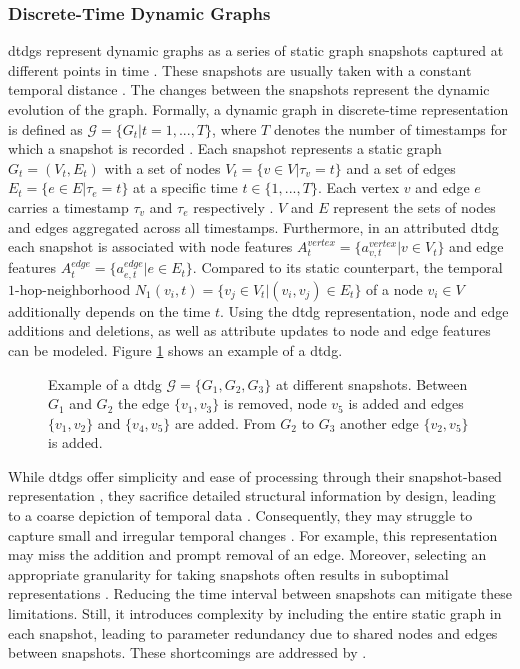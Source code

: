 \subsubsection{Discrete-Time Dynamic Graphs}
\label{s_Background_Graphs_DTDGs}
\glspl{dtdg} represent dynamic graphs as a series of static graph snapshots captured at different points in time \cite{rossi_temporal_2020}. These snapshots are usually taken with a constant temporal distance \cite{souza_provably_2022}. The changes between the snapshots represent the dynamic evolution of the graph. Formally, a dynamic graph in discrete-time representation is defined as $\mathcal{G} = \{G_t | t = 1,...,T\}$, where $T$ denotes the number of timestamps for which a snapshot is recorded \cite{you_roland_2022}. Each snapshot represents a static graph $G_t = (V_t, E_t)$ with a set of nodes $V_t = \{v \in V | \tau_v = t\}$ and a set of edges $E_t = \{e \in E | \tau_e = t\}$ at a specific time $t \in \{1, ..., T\}$. Each vertex $v$ and edge $e$ carries a timestamp $\tau_v$ and $\tau_e$ respectively \cite{you_roland_2022}. $V$ and $E$ represent the sets of nodes and edges aggregated across all timestamps. Furthermore, in an attributed \gls{dtdg} each snapshot is associated with node features $A_t^{vertex} = \{a_{v,t}^{vertex} | v \in V_t\}$ and edge features $A_t^{edge} = \{a_{e,t}^{edge} | e \in E_t\}$. Compared to its static counterpart, the temporal $1$-hop-neighborhood $N_1(v_i, t) = \{v_j \in V_t | (v_i, v_j) \in E_t\}$ of a node $v_i \in V$ additionally depends on the time $t$. Using the \gls{dtdg} representation, node and edge additions and deletions, as well as attribute updates to node and edge features can be modeled. Figure \ref{f_dtdg} shows an example of a \gls{dtdg}.


\begin{figure}[h]
    
    \caption{Example of a \gls{dtdg} $\mathcal{G}=\{G_1, G_2, G_3\}$ at different snapshots. Between $G_1$ and $G_2$ the edge $\{v_1, v_3\}$ is removed, node $v_5$ is added and edges $\{v_1, v_2\}$ and $\{v_4, v_5\}$ are added. From $G_2$ to $G_3$ another edge $\{v_2, v_5\}$ is added.}
    \label{f_dtdg}
\end{figure}

While \glspl{dtdg} offer simplicity and ease of processing through their snapshot-based representation \cite{kazemi_representation_2019}, they sacrifice detailed structural information by design, leading to a coarse depiction of temporal data \cite{trivedi_dyrep_2019, kazemi_representation_2019}. Consequently, they may struggle to capture small and irregular temporal changes \cite{trivedi_dyrep_2019, souza_provably_2022}. For example, this representation may miss the addition and prompt removal of an edge. Moreover, selecting an appropriate granularity for taking snapshots often results in suboptimal representations \cite{trivedi_dyrep_2019}. Reducing the time interval between snapshots can mitigate these limitations. Still, it introduces complexity by including the entire static graph in each snapshot, leading to parameter redundancy due to shared nodes and edges between snapshots. These shortcomings are addressed by .

